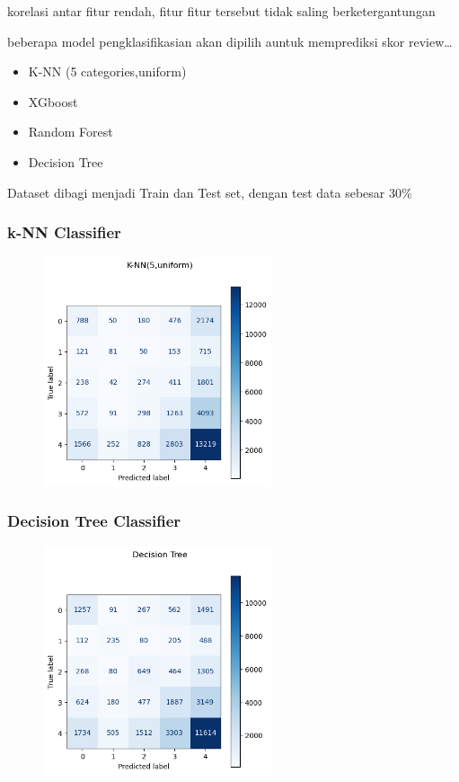 \documentclass{beamer}
\begin{document}
\begin{frame}
    korelasi antar fitur rendah, fitur fitur tersebut tidak saling berketergantungan 
\end{frame}

\begin{frame}
    beberapa model pengklasifikasian akan dipilih auntuk memprediksi skor review\dots
    \begin{itemize}
        \item K-NN (5 categories,uniform)
        \item XGboost
        \item Random Forest
        \item Decision Tree
    \end{itemize}
    Dataset dibagi menjadi Train dan Test set, dengan test data sebesar 30\%
\end{frame}

\begin{frame}
    \frametitle{k-NN Classifier}
    \graphicspath{ {./images/} }
    \begin{figure}
    \centering
    \includegraphics[width=0.6\textwidth]{knn-confusion.png}
    \end{figure}
\end{frame}


\begin{frame}
    \frametitle{Decision Tree Classifier}
    \graphicspath{ {./images/} }
    \begin{figure}
    \centering
    \includegraphics[width=0.6\textwidth]{Dt-confusion.png}
    \end{figure}
\end{frame}
\end{document}
